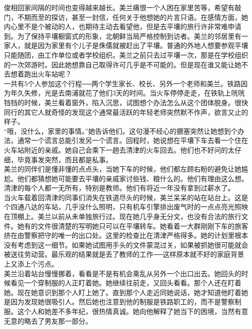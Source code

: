 俊相回家间隔的时间也变得越来越长。美兰痛恨一个人困在家里苦等，希望有敲门，不期而至的探访，甚至一封信，任何关于他想她的片言只语。在感情方面，她内心里不是个被动的人，也期待主动去看望他，但是去平壤的旅行许非常难申请到。为了保持平壤橱窗式的形象，北朝鲜当局严格控制到访者。美兰的邻居里有一家人，就是因为家里有个儿子是侏儒就被赶出了平壤。普通的外地人想要参观平壤只能随团，由工作单位或者学校组织。美兰之前只去过平壤一次，那是在学校组织的一次郊游时。因此她想靠自己取得许可几乎是不可能的。但是现在谁又能让她不去想着跑出火车站呢？\\

一共有5个人参加这个行程──两个学生家长、校长、另外一个老师和美兰。铁路因为年久失修，光是去南浦就花了他们3天的时间。当火车停停走走，在铁轨上咣咣铛铛的时候，美兰看着窗外，陷入沉思，试图想个办法怎么从这个团体脱身。很快同行的其它人就奇怪的发现这个通常最活跃的年轻老师突然默不作声，欲言又止的样子。\\

“哦，没什么，家里的事情。”她告诉他们。这句漫不经心的搪塞突然让她想到个办法，通常一个谎言总能引发另一个谎言。回程时，她说想在平壤下车去看一个住在火车站附近的亲戚。她自己会乘下一趟去清津的火车回去。他们也不好问的太仔细，毕竟事发突然，而且都是私事。\\

美兰的同伴们是懂非懂的点点头，当她下车的时候，他们都左顾右盼的避免让她尴尬。他们都猜想她可能要去平壤的亲戚家讨些钱、粮什么的。他们有理由这么想。清津的每个人都一无所有，特别是教师。他们有将近一年没有拿到过薪水了。\\

当火车载着回清津的同事们消失在铁道尽头的时候，美兰呆呆的站在站台上。这是个四通八达的车站，几乎没什么照明，只有机车引擎排出废气时的一点点亮光照映在顶棚上。美兰以前从未单独旅行过。现在她几乎身无分文，也没有合法的旅行文件。她有的文件很清楚的写明她只可以在平壤转车。她看着一大群刚刚下车的旅客挤在由警察把守的唯一的出口处。这里的检查比在清津严格得多。她的计划里根本没有考虑到这一细节。如果她试图用手头的文件蒙混过关，如果被抓她很可能就会被送往劳动营。最乐观的结果就是丢了教师的工作──这样原本就不好的家庭背景上又添上个污点。\\

美兰沿着站台慢慢挪着，看看是不是有机会乘乱从另外一个出口出去。她回头的时候看见一个穿制服的人正盯着她。她继续往前走，又回头看看。那个人还在盯着她。现在她意识到那个人盯上她了。直到那个人走近同她说话，她才知道他盯着她是因为发现她很吸引人。然后她也注意到他的制服是铁路职工的，而不是警察制服。这个人和她差不多年纪，很热情真诚。她向他解释了她当下的困境，当然有意无意的略去了男友那一部分。\\

